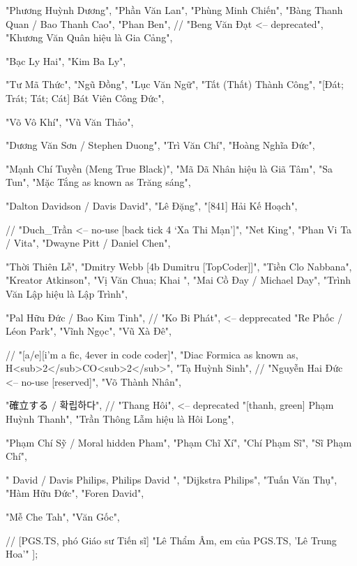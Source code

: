            "Phương Huỳnh Dương",
            "Phần Văn Lan",
            "Phùng Minh Chiến",
            "Bàng Thanh Quan / Bao Thanh Cao",
            "Phan Ben",
            // "Beng Văn Đạt <-- deprecated",
            "Khương Văn Quân hiệu là Gia Cảng",

            "Bạc Ly Hai",
            "Kim Ba Ly",

            "Tư Mã Thức",
            "Ngũ Đồng",
            "Lục Văn Ngữ",
            "Tất (Thất) Thành Công",
            "[Đát; Trát; Tát; Cát] Bát Viên Công Đức",

            "Võ Vô Khí",
            "Vũ Văn Thảo",

            "Dương Văn Sơn / Stephen Duong",
            "Trì Văn Chí",
            "Hoàng Nghĩa Đức",

            "Mạnh Chí Tuyền (Meng True Black)",
            "Mã Dã Nhân hiệu là Giã Tâm",
            "Sa Tun",
            "Mặc Tắng as known as Trăng sáng",

            "Dalton Davidson / Davis David",
            "Lê Đặng",
            "[841] Hải Kế Hoạch",

            // "Duch_Trần <-- no-use [back tick 4 ‘Xa Thi Mạn’]",
            "Net King",
            "Phan Vi Ta / Vita",
            "Dwayne Pitt / Daniel Chen",

            "Thời Thiên Lễ",
            "Dmitry Webb [4b Dumitru [TopCoder]]",
            "Tiền Clo Nabbana",
            "Kreator Atkinson",
            "Vị Văn { Chua; Khai }",
            "Mai Cồ Đay / Michael Day",
            "Trình Văn Lập hiệu là Lập Trình",

            "Pal Hữu Đức / Bao Kim Tinh",
            // "Ko Bi Phát", <-- depprecated
            "Re Phốc / Léon Park",
            "Vĩnh Ngọc",
            "Vũ Xà Đê",

            // "[a/e][i’m a { fic, 4ever in code } coder]",
            "Diac Formica as known as, H<sub>2</sub>CO<sub>2</sub>",
            "Tạ Huỳnh Sinh",
            // "Nguyễn Hai Đức <-- no-use [reserved]",
            "Võ Thành Nhân",

            "確立する / 확립하다",
            // "Thang Hôi", <-- deprecated
            "[thanh, green] Phạm Huỳnh Thanh",
            "Trần Thông Lẫm hiệu là Hôi Long",

            "Phạm Chí Sỹ / Moral hidden Pham",
            "Phạm Chĩ Xí",
            "Chí Phạm Sĩ",
            "Sĩ Phạm Chí",

            "{ David / Davis Philips, Philips David }",
            "Dijkstra Philips",
            "Tuấn Văn Thụ",
            "Hàm Hữu Đức",
            "Foren David",

            "Mễ Che Tah",
            "Văn Gốc",

            // [PGS.TS, phó Giáo sư Tiến sĩ]
            "Lê Thẩm Âm, em của PGS.TS, 'Lê Trung Hoa'"
        ];



